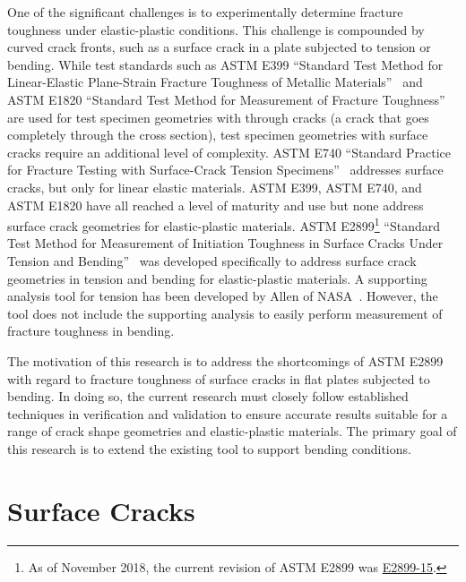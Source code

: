 One of the significant challenges is to experimentally determine fracture toughness under elastic-plastic conditions.
This challenge is compounded by curved crack fronts, such as a surface crack in a plate subjected to tension or bending.
While test standards such as ASTM E399 ``Standard Test Method for Linear-Elastic Plane-Strain Fracture Toughness \KIc of Metallic Materials''~\cite{astme399} and ASTM E1820 ``Standard Test Method for Measurement of Fracture Toughness''~\cite{astme1820} are used for test specimen geometries with through cracks (a crack that goes completely through the cross section), test specimen geometries with surface cracks require an additional level of complexity.
ASTM E740 ``Standard Practice for Fracture Testing with Surface-Crack Tension Specimens''~\cite{astme740} addresses surface cracks, but only for linear elastic materials.
ASTM E399, ASTM E740, and ASTM E1820 have all reached a level of maturity and use but none address surface crack geometries for elastic-plastic materials.
ASTM E2899\footnote{As of November 2018, the current revision of ASTM E2899 was \href{https://www.astm.org/Standards/E2899.htm}{E2899-15}.} ``Standard Test Method for Measurement of Initiation Toughness in Surface Cracks Under Tension and Bending''~\cite{astme2899} was developed specifically to address surface crack geometries in tension and bending for elastic-plastic materials.
A supporting analysis tool for tension has been developed by Allen of NASA~\cite{allenwells2014}.
However, the tool does not include the supporting analysis to easily perform measurement of fracture toughness in bending.

The motivation of this research is to address the shortcomings of ASTM E2899 with regard to fracture toughness of surface cracks in flat plates subjected to bending.
In doing so, the current research must closely follow established techniques in verification and validation to ensure accurate results suitable for a range of crack shape geometries and elastic-plastic materials.
The primary goal of this research is to extend the existing tool to support bending conditions.

\section{Surface Cracks}


